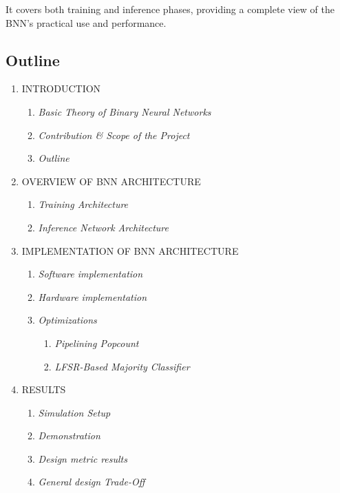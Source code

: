 \documentclass[conference]{IEEEtran}
\begin{document}
It covers both training and inference phases, providing a complete view of the BNN's practical use and performance.

\subsection{Outline}
\begin{enumerate}[label=\Roman*.]
    \item INTRODUCTION
    \begin{enumerate}[label=\Alph*.]
        \item \textit{Basic Theory of Binary Neural Networks}
        \item \textit{Contribution \& Scope of the Project}
        \item \textit{Outline}
    \end{enumerate}
    \item OVERVIEW OF BNN ARCHITECTURE
    \begin{enumerate}[label=\Alph*.]
        \item \textit{Training Architecture}
        \item \textit{Inference Network Architecture}
    \end{enumerate}
    \item IMPLEMENTATION OF BNN ARCHITECTURE
        \begin{enumerate}[label=\Alph*.]
            \item \textit{Software implementation}
            \item \textit{Hardware implementation}
            \item \textit{Optimizations}
            \begin{enumerate}[label=\arabic*.]
                \item \textit{Pipelining Popcount}
                \item \textit{LFSR-Based Majority Classifier}
            \end{enumerate}
        \end{enumerate}
    \item RESULTS
        \begin{enumerate}[label=\Alph*.]
            \item \textit{Simulation Setup}
            \item \textit{Demonstration}
            \item \textit{Design metric results}
            \item \textit{General design Trade-Off}

\end{enumerate}
\end{enumerate}
\end{document}
